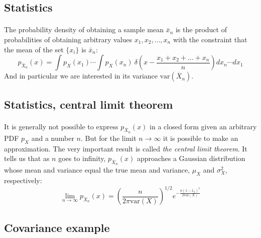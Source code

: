 \documentclass[%
oneside,                 %
final,                   %
10pt]{article}
\begin{document}
\subsection*{Statistics}

\paragraph{}
The probability density of obtaining a sample mean $\bar x_n$
is the product of probabilities of obtaining arbitrary values $x_1,
x_2,\dots,x_n$ with the constraint that the mean of the set $\{x_i\}$
is $\bar x_n$:
\[
p_{\overline X_n}(x) = \int p_X^{\phantom X}(x_1)\cdots
\int p_X^{\phantom X}(x_n)\ 
\delta\!\left(x - \frac{x_1+x_2+\dots+x_n}{n}\right)dx_n \cdots dx_1
\]
And in particular we are interested in its variance $\mathrm{var}(\overline X_n)$.





\subsection*{Statistics, central limit theorem}

\paragraph{}
It is generally not possible to express $p_{\overline X_n}(x)$ in a
closed form given an arbitrary PDF $p_X^{\phantom X}$ and a number
$n$. But for the limit $n\to\infty$ it is possible to make an
approximation. The very important result is called \emph{the central limit theorem}. It tells us that as $n$ goes to infinity,
$p_{\overline X_n}(x)$ approaches a Gaussian distribution whose mean
and variance equal the true mean and variance, $\mu_{X}^{\phantom X}$
and $\sigma_{X}^{2}$, respectively:
\begin{equation}
\lim_{n\to\infty} p_{\overline X_n}(x) =
\left(\frac{n}{2\pi\mathrm{var}(X)}\right)^{1/2}
e^{-\frac{n(x-\bar x_n)^2}{2\mathrm{var}(X)}}
\label{eq:central_limit_gaussian}
\end{equation}




\subsection*{Covariance example}
\end{document}
